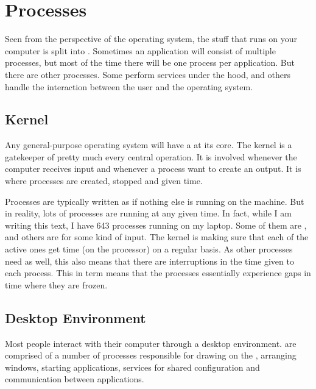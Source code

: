\section{Processes}

Seen from the perspective of the operating system, the stuff that runs on your computer is split into . Sometimes an application will consist of multiple processes, but most of the time there will be one process per application. But there are other processes. Some perform services under the hood, and others handle the interaction between the user and the operating system.

\subsection{Kernel}

Any general-purpose operating system will have a  at its core. The kernel is a gatekeeper of pretty much every central operation. It is involved whenever the computer receives input and whenever a process want to create an output. It is where processes are created, stopped and given time.

Processes are typically written as if nothing else is running on the machine. But in reality, lots of processes are running at any given time. In fact, while I am writing this text, I have 643 processes running on my laptop. Some of them are , and others are  for some kind of input. The kernel is making sure that each of the active ones get time (on the processor) on a regular basis. As other processes need  as well, this also means that there are interruptions in the time given to each process. This in term means that the processes essentially experience gaps in time where they are frozen.

\subsection{Desktop Environment}

Most people interact with their computer through a desktop environment.  are comprised of a number of processes responsible for drawing on the , arranging windows, starting applications, services for shared configuration and communication between applications.

